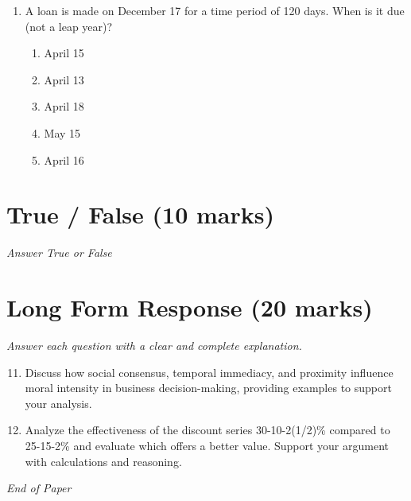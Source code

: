 \documentclass[12pt]{article}
\begin{document}
\begin{enumerate}[label=\arabic*.]
\begin{enumerate}[label=(\alph*)]
    \item Ecological, equitable, and economic
    \item Equitable, evolutionary, and emerging
    \item Evolutionary, equitable, and economic.
\end{enumerate}
\item A loan is made on December 17 for a time period of 120 days. When is it due (not a leap year)?
\begin{enumerate}[label=(\alph*)]
    \item April 15
    \item April 13
    \item April 18
    \item May 15
    \item April 16
\end{enumerate}
\end{enumerate}

\section*{True / False (10 marks)}
\textit{Answer True or False}

\section*{Long Form Response (20 marks)}
\textit{Answer each question with a clear and complete explanation.}
\begin{enumerate}[label=\arabic*.]
\setcounter{enumi}{10}
\item Discuss how social consensus, temporal immediacy, and proximity influence moral intensity in business decision-making, providing examples to support your analysis.
\item Analyze the effectiveness of the discount series 30-10-2(1/2)\% compared to 25-15-2\% and evaluate which offers a better value. Support your argument with calculations and reasoning.
\end{enumerate}

\vfill
\noindent\textit{End of Paper}
\end{document}
